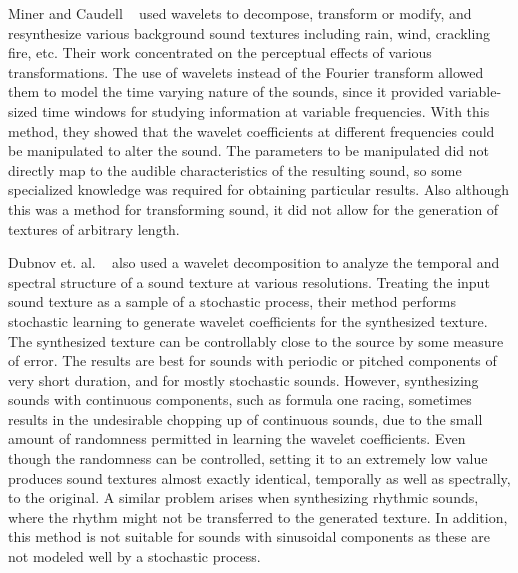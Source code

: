 \documentclass{acmsiggraph}               %
\begin{document}
Miner and Caudell ~ used wavelets to decompose, 
transform or modify, and resynthesize various background sound textures 
including rain, wind, crackling fire, etc. Their work concentrated on 
the perceptual effects of various transformations.
The use of wavelets instead of the Fourier transform allowed them to 
model the time varying nature of the sounds, since it provided 
variable-sized time windows for studying information at variable 
frequencies. With this method, they showed that the wavelet coefficients 
at different frequencies could be manipulated to alter the sound. The 
parameters to be manipulated did not directly map to the audible 
characteristics of the resulting sound, so some specialized knowledge 
was required for obtaining particular results. Also although this was a 
method for transforming sound, it did not allow for the generation of 
textures of arbitrary length. 

Dubnov et. al. ~ also used a wavelet decomposition to 
analyze the temporal and spectral structure of a sound texture at various 
resolutions. Treating the input sound texture as a sample of a 
stochastic process, their method performs stochastic learning to generate 
wavelet coefficients for the synthesized texture. The synthesized texture 
can be controllably close to the source by some measure of error. 
The results are best for sounds with periodic or pitched components of very short 
duration, and for mostly stochastic sounds. However, synthesizing 
sounds with continuous components, such as formula one racing,  
sometimes results in the undesirable chopping up of continuous sounds, 
due to the small amount of randomness permitted in learning the wavelet 
coefficients. Even though the randomness can be controlled, 
setting it to an extremely low value produces sound textures almost 
exactly identical, temporally as well as spectrally, to the original. A similar 
problem arises when synthesizing rhythmic sounds, where the rhythm might not 
be transferred to the generated texture. In addition, this method is not suitable 
for sounds with sinusoidal components as these are not modeled well by a stochastic 
process.
\end{document}
